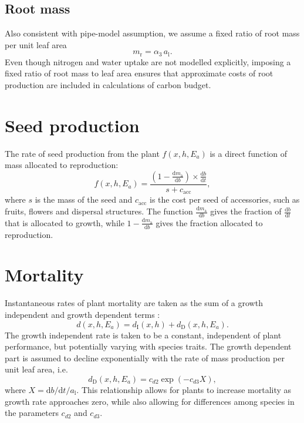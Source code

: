 \documentclass[10pt,twoside]{article}
\begin{document}
\subsection{Root mass}\label{root-mass}

Also consistent with pipe-model assumption, we assume a fixed ratio of
root mass per unit leaf area
\begin{equation}\label{eq:mr}
m_\textrm{r}=\alpha_3 \, a_\textrm{l}.
\end{equation}
Even though nitrogen and water uptake are not modelled explicitly,
imposing a fixed ratio of root mass to leaf area ensures that
approximate costs of root production are included in calculations of
carbon budget.

\section{Seed production}\label{seed-production}

The rate of seed production from the plant \(f(x,h,E_a)\) is a direct
function of mass allocated to reproduction:
\begin{equation}\label{eq:fecundity}
f(x,h,E_a) = \frac{(1-\frac{\textrm{d}m_\textrm{a}}{\textrm{d}b}) \times \frac{\textrm{d}b}{\textrm{d}t}}{
  s + c_{\textrm{acc}}},
\end{equation}
where \(s\) is the mass of the seed and \(c_{\textrm{acc}}\) is the cost
per seed of accessories, such as fruits, flowers and dispersal
structures. The function $\frac{\textrm{d}m_\textrm{a}}{\textrm{d}b}$ gives the fraction
of $\frac{\textrm{d}b}{\textrm{d}t}$ that is allocated to growth, while 
$1-\frac{\textrm{d}m_\textrm{a}}{\textrm{d}b}$ gives the  fraction allocated
to reproduction.

\section{Mortality}\label{mortality}

Instantaneous rates of plant mortality are taken as the sum of a growth
independent and growth dependent terms
\citep{Falster-2011, Moorcroft-2001}:
\begin{equation}\label{eq:mortality}
d(x,h,E_a) = d_{\textrm{I}}(x,h) + d_{\textrm{D}}(x,h,E_a).
\end{equation}
The growth independent rate is taken to be a constant, independent of
plant performance, but potentially varying with species traits. The
growth dependent part is assumed to decline exponentially with the rate
of mass production per unit leaf area, i.e.
\begin{equation}\label{eq:mortality_GD}
d_{\textrm{D}}(x,h,E_a) =  c_{d2}  \exp(-c_{d3} X),
\end{equation}
where \(X = \textrm{d}b / \textrm{d}t / a_\textrm{l}\). This
relationship allows for plants to increase mortality as growth rate
approaches zero, while also allowing for differences among species in
the parameters \(c_{d2}\) and \(c_{d3}\).
\end{document}
